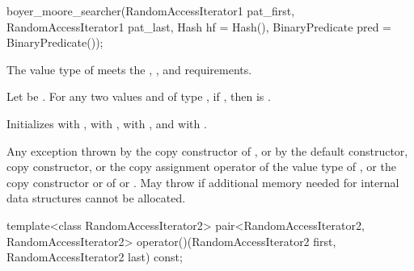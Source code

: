 %
\begin{itemdecl}
boyer_moore_searcher(RandomAccessIterator1 pat_first,
                     RandomAccessIterator1 pat_last,
                     Hash hf = Hash(),
                     BinaryPredicate pred = BinaryPredicate());
\end{itemdecl}

\begin{itemdescr}
\pnum
\expects
The value type of  meets
the ,
, and
 requirements.

\pnum
Let  be .
For any two values  and  of type ,
if , then  is .

\pnum
\effects
Initializes
 with ,
 with ,
 with , and
\mbox{} with .

\pnum
\throws
Any exception thrown by the copy constructor of ,
or by the default constructor, copy constructor, or the copy assignment operator of the value type of ,
or the copy constructor or  of  or .
May throw  if additional memory needed for internal data structures cannot be allocated.
\end{itemdescr}

%
\begin{itemdecl}
template<class RandomAccessIterator2>
  pair<RandomAccessIterator2, RandomAccessIterator2>
    operator()(RandomAccessIterator2 first, RandomAccessIterator2 last) const;
\end{itemdecl}

